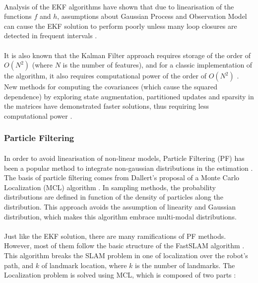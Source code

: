 \documentclass[11pt]{article}
\begin{document}
	\paragraph{}	
	 Analysis of the EKF algorithms have shown that due to linearisation of the functions $f$ and $h$, assumptions about Gaussian Process and Observation Model can cause the EKF solution to perform poorly unless many loop closures are detected in frequent intervals \cite{doi:10.1177/1729881416669482}.


	\paragraph{}
	It is also known that the Kalman Filter approach requires storage of the order of $O(N^2)$ (where $N$ is the number of features), and for a classic implementation of the algorithm, it also requires computational power of the order of $O(N^2)$ \cite{CsorbaThesis}. New methods for computing the covariances (which cause the squared dependence) by exploring state augmentation, partitioned updates and sparsity in the matrices have demonstrated faster solutions, thus requiring less computational power \cite{SLAMPartII}.

	\subsubsection{Particle Filtering}
	\paragraph{} 
	In order to avoid linearisation of non-linear models, Particle Filtering (PF) has been a popular method to integrate non-gaussian distributions in the estimation \cite{Montemerlo02fastslam:a}\cite{772544}. The basis of particle filtering comes from Dallert's proposal of a Monte Carlo Localization (MCL) algorithm \cite{772544}. In sampling methods, the probability distributions are defined in function of the density of particles along the distribution. This approach avoids the assumption of linearity and Gaussian distribution, which makes this algorithm embrace multi-modal distributions.
	
	\paragraph{}
	Just like the EKF solution, there are many ramifications of PF methods. However, most of them follow the basic structure of the FastSLAM algorithm \cite{Montemerlo02fastslam:a}. This algorithm breaks the SLAM problem in one of localization over the robot's path, and $k$ of landmark location, where $k$ is the number of landmarks. The Localization problem is solved using MCL, which is composed of two parts \cite{772544}:
	 
\end{document}
